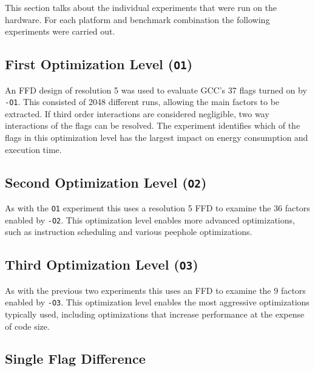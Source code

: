 \documentclass[twocolumn]{article}
\begin{document}
This section talks about the individual experiments that were run on the hardware. For each platform and benchmark combination the following experiments were carried out.

\subsection*{First Optimization Level (\texttt{O1})}

An FFD design of resolution 5 was used to evaluate GCC's 37 flags turned on by \texttt{-O1}. This consisted of 2048 different runs, allowing the main factors to be extracted. If third order interactions are considered negligible, two way interactions of the flags can be resolved. The experiment identifies which of the flags in this optimization level has the largest impact on energy consumption and execution time.

\subsection*{Second Optimization Level (\texttt{O2})}

As with the \texttt{O1} experiment this uses a resolution 5 FFD to examine the 36 factors enabled by \texttt{-O2}. This optimization level enables more advanced optimizations, such as instruction scheduling and various peephole optimizations.

\subsection*{Third Optimization Level (\texttt{O3})}

As with the previous two experiments this uses an FFD to examine the 9 factors enabled by \texttt{-O3}. This optimization level enables the most aggressive optimizations typically used, including optimizations that increase performance at the expense of code size.



\subsection*{Single Flag Difference}
\end{document}
